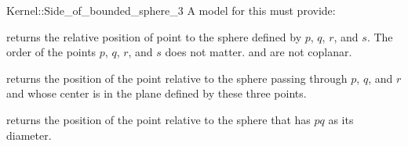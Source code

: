 \begin{ccRefFunctionObjectConcept}{Kernel::Side_of_bounded_sphere_3}
A model for this must provide:


         {returns the relative position of point 
          to the sphere defined by $p$, $q$, $r$, and $s$. The order
          of the points $p$, $q$, $r$, and $s$ does not matter.
          \ccPrecond {} and  are not coplanar.}

   {returns the position of the point  relative to the sphere
    passing through $p$, $q$, and $r$ and whose center is in the plane defined
    by these three points.}

         {returns the position of the point  relative to the sphere
          that has $pq$ as its diameter.}

\end{ccRefFunctionObjectConcept}
